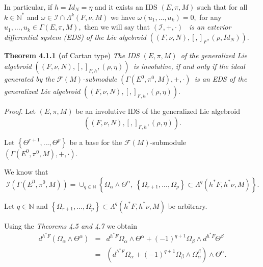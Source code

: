 \documentclass[11pt]{article}
\begin{document}
In particular, if $h=Id_{N}=\eta $ and it exists an IDS $\left( E,\pi
,M\right) $ such that for all $k\in \mathbb{N}^{\ast }$ and $\omega \in
\mathcal{I}\cap \Lambda ^{k}\left( F,\nu ,M\right) $ we have $\omega \left(
u_{1},...,u_{k}\right) =0,$ for any $u_{1},...,u_{k}\in \Gamma \left( E,\pi
,M\right) ,$ then we will say that $\left( \mathcal{I},+,\cdot \right) $%
\emph{\ is an exterior differential system (EDS) of the Lie algebroid }$%
\left( \left( F,\nu ,N\right) ,\left[ ,\right] _{F},\left( \rho
,Id_{N}\right) \right) .$

\textbf{Theorem 4.1.1 (}of Cartan type) \emph{The IDS }$\left( E,\pi
,M\right) $\emph{\ of the generalized Lie algebroid }$\left( \left( F,\nu
,N\right) ,\left[ ,\right] _{F,h},\left( \rho ,\eta \right) \right) $\emph{\
is involutive, if and only if the ideal generated by the }$\mathcal{F}\left(
M\right) $\emph{-submodule }$\left( \Gamma \left( E^{0},\pi ^{0},M\right)
,+,\cdot \right) $\emph{\ is an EDS of the generalized Lie algebroid }$%
\left( \left( F,\nu ,N\right) ,\left[ ,\right] _{F,h},\left( \rho ,\eta
\right) \right) .$

\emph{Proof. }Let $\left( E,\pi ,M\right) $ be an involutive IDS of the
generalized Lie algebroid
\begin{equation*}
\left( \left( F,\nu ,N\right) ,\left[ ,\right] _{F,h},\left( \rho ,\eta
\right) \right) .
\end{equation*}

Let $\left\{ \Theta ^{r+1},...,\Theta ^{p}\right\} $ be a base for the $%
\mathcal{F}\left( M\right) $-submodule $\left( \Gamma \left( E^{0},\pi
^{0},M\right) ,+,\cdot \right) .$

We know that
\begin{equation*}
\mathcal{I}\left( \Gamma \left( E^{0},\pi ^{0},M\right) \right) =\cup _{q\in
\mathbb{N}}\left\{ \Omega _{\alpha }\wedge \Theta ^{\alpha },~\left\{ \Omega
_{r+1},...,\Omega _{p}\right\} \subset \Lambda ^{q}\left( h^{\ast }F,h^{\ast
}\nu ,M\right) \right\} .
\end{equation*}

Let $q\in \mathbb{N}$ and $\left\{ \Omega _{r+1},...,\Omega _{p}\right\}
\subset \Lambda ^{q}\left( h^{\ast }F,h^{\ast }\nu ,M\right) $ be arbitrary.

Using the \emph{Theorems 4.5 and 4.7} we obtain
\begin{equation*}
\begin{array}{ccl}
d^{h^{\ast }F}\left( \Omega _{\alpha }\wedge \Theta ^{\alpha }\right) & = &
d^{h^{\ast }F}\Omega _{\alpha }\wedge \Theta ^{\alpha }+\left( -1\right)
^{q+1}\Omega _{\beta }\wedge d^{h^{\ast }F}\Theta ^{\beta } \\
& = & \left( d^{h^{\ast }F}\Omega _{\alpha }+\left( -1\right) ^{q+1}\Omega
_{\beta }\wedge \Omega _{\alpha }^{\beta }\right) \wedge \Theta ^{\alpha }.%
\end{array}%
\end{equation*}
\end{document}
